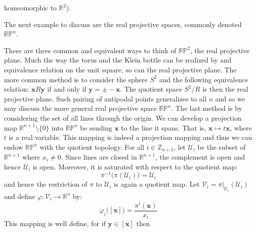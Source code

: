 \documentclass{article}                                                        %
\begin{document}
        homeomorphic to $\mathbb{R}^{2}$).
        \par\hfill\par
        The next example to discuss are the real projective spaces, commonly
        denoted $\mathbb{RP}^{n}$.
        \begin{example}
            There are three common and equivalent ways to think of
            $\mathbb{RP}^{2}$, the real projective plane. Much the way the
            torus and the Klein bottle can be realized by and equivalence
            relation on the unit square, so can the real projective plane. The
            more common method is to consider the sphere $S^{2}$ and the
            following equivalence relation: $\mathbf{x}R\mathbf{y}$ if and only
            if $\mathbf{y}=\pm\minus\mathbf{x}$. The quotient space
            $S^{2}/R$ is then the real projective plane. Such pairing of
            antipodal points generalizes to all $n$ and so we may discuss the
            more general real projective space $\mathbb{RP}^{n}$. The last
            method is by considering the set of all lines through the origin.
            We can develop a projection map $\mathbb{R}^{n+1}\setminus\{0\}$
            into $\mathbb{RP}^{n}$ be sending $\mathbf{x}$ to the line it spans.
            That is, $\mathbf{x}\mapsto{t}\mathbf{x}$, where $t$ is a real
            variable. This mapping is indeed a projection mapping and thus we
            can endow $\mathbb{RP}^{n}$ with the quotient topology. For all
            $i\in\mathbb{Z}_{n+1}$, let $\mathcal{U}_{i}$ be the subset of
            $\mathbb{R}^{n+1}$ where $x_{i}\ne{0}$. Since lines are closed in
            $\mathbb{R}^{n+1}$, the complement is open and hence
            $\mathcal{U}_{i}$ is open. Moreover, it is saturated with respect to
            the quotient map:
            \begin{equation}
                \pi^{\minus{1}}\big(\pi(\mathcal{U}_{i})\big)=\mathcal{U}_{i}
            \end{equation}
            and hence the restriction of $\pi$ to $\mathcal{U}_{i}$ is again a
            quotient map. Let
            $\mathcal{V}_{i}=\pi|_{\mathcal{U}_{i}}(\mathcal{U}_{i})$ and define
            $\varphi:\mathcal{V}_{i}\rightarrow\mathbb{R}^{n}$ by:
            \begin{equation}
                \varphi_{i}\big([\mathbf{x}]\big)=
                    \frac{\pi^{i}(\mathbf{x})}{x_{i}}
            \end{equation}
            This mapping is well define, for if $\mathbf{y}\in[\mathbf{x}]$ then

\end{example}
\end{document}
